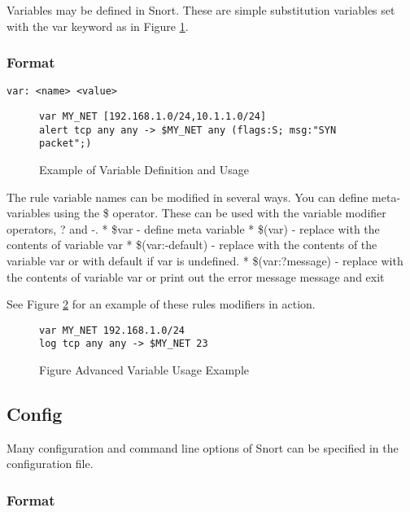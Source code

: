 \documentclass[english]{report}
\begin{document}
Variables may be defined in Snort. These are simple substitution variables
set with the var keyword as in Figure \ref{variable definition}.


\subsubsection{Format}

\begin{verbatim}
var: <name> <value>
\end{verbatim}


%
\begin{figure}[!hbpt]
\begin{verbatim}
var MY_NET [192.168.1.0/24,10.1.1.0/24]
alert tcp any any -> $MY_NET any (flags:S; msg:"SYN packet";)
\end{verbatim}

\caption{Example of Variable Definition and Usage\label{variable definition}}
\end{figure}

The rule variable names can be modified in several ways. You can define
meta-variables using the \$ operator. These can
be used with the variable modifier operators, ?
and -. {*} \$var - define meta variable {*} \$(var)
- replace with the contents of variable var {*}
\$(var:-default) - replace with the contents of the variable var
or with default if var is
undefined. {*} \$(var:?message) - replace with the contents of variable
var or print out the error message message
and exit

See Figure \ref{advanced variable usage} for an example of these
rules modifiers in action.

%
\begin{figure}[!hbpt]
\begin{verbatim}
var MY_NET 192.168.1.0/24
log tcp any any -> $MY_NET 23
\end{verbatim}

\caption{Figure Advanced Variable Usage Example\label{advanced variable usage}}
\end{figure}



\subsection{Config}

Many configuration and command line options of Snort can be specified
in the configuration file. 


\subsubsection{Format}
\end{document}
